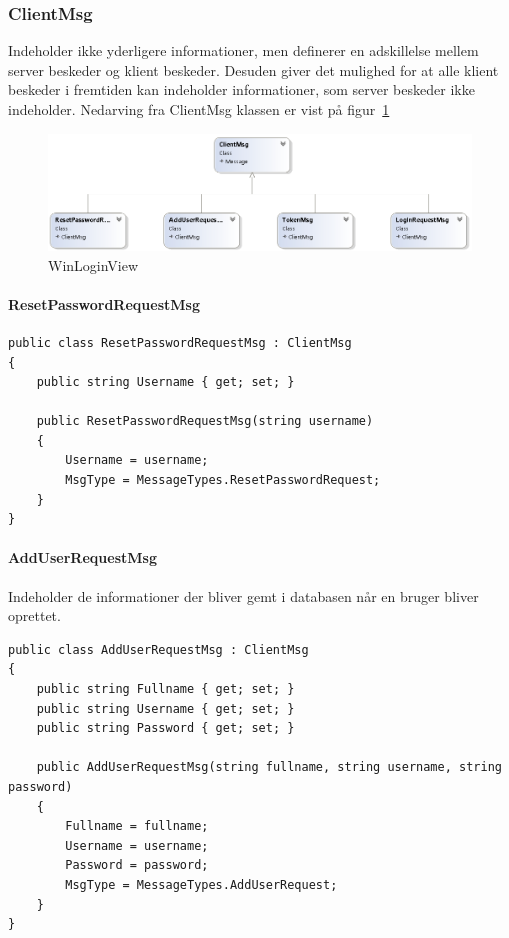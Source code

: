 \subsubsection{ClientMsg}
Indeholder ikke yderligere informationer, men definerer en adskillelse mellem server beskeder og klient beskeder. Desuden giver det mulighed for at alle klient beskeder i fremtiden kan indeholder informationer, som server beskeder ikke indeholder. Nedarving fra ClientMsg klassen er vist på figur~\ref{fig:ClientMsgUML}

\begin{figure}
	\centering
	\includegraphics[width=0.7\linewidth]{figs/connection/ClientMsgUML.png}
	\caption{WinLoginView}
	\label{fig:ClientMsgUML}
\end{figure}

\paragraph{ResetPasswordRequestMsg}
\begin{lstlisting}[caption=ResetPasswordRequestMsg, label=code:ResetPasswordRequestMsg]
public class ResetPasswordRequestMsg : ClientMsg
{
	public string Username { get; set; }
	
	public ResetPasswordRequestMsg(string username)
	{
		Username = username;
		MsgType = MessageTypes.ResetPasswordRequest;
	}
}
\end{lstlisting}

\paragraph{AddUserRequestMsg}
Indeholder de informationer der bliver gemt i databasen når en bruger bliver oprettet.
\begin{lstlisting}[caption=AddUserRequestMsg, label=code:AddUserRequestMsg]
public class AddUserRequestMsg : ClientMsg
{
	public string Fullname { get; set; }
	public string Username { get; set; }
	public string Password { get; set; }
	
	public AddUserRequestMsg(string fullname, string username, string password)
	{
		Fullname = fullname;
		Username = username;
		Password = password;
		MsgType = MessageTypes.AddUserRequest;
	}
}
\end{lstlisting}

